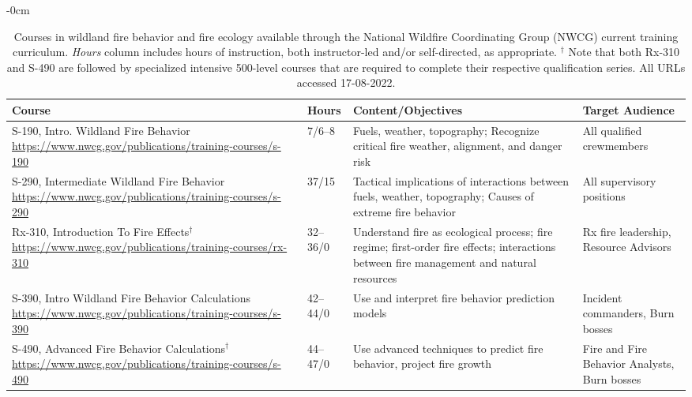 \documentclass[fire,casereport,accept,moreauthors,pdftex]{Definitions/mdpi}  %
\begin{document}
\begin{table}[H] 
\tablesize{\footnotesize}
\caption{Courses in wildland fire behavior and fire ecology available through the National Wildfire Coordinating Group (NWCG) current training curriculum.
\emph{Hours} column includes hours of instruction, both instructor-led and/or self-directed, as appropriate. 
$^\dagger$ Note that both Rx-310 and S-490 are followed by specialized intensive 500-level courses that are required to complete their respective qualification series. All URLs accessed 17-08-2022.}
\label{tab:training}
\begin{adjustwidth}{-\extralength}{0cm}
		\begin{tabularx}{\fulllength}{CCCC}
\toprule
\textbf{Course} & \textbf{Hours} & \textbf{Content/Objectives} & \textbf{Target Audience} \\ \midrule

{{S-190, Intro. Wildland Fire Behavior}} \url{https://www.nwcg.gov/publications/training-courses/s-190}  & 7/6--8 & Fuels, weather, topography; Recognize critical fire weather, alignment, and danger risk & All qualified crewmembers \\
{S-290, Intermediate Wildland Fire Behavior} \url{https://www.nwcg.gov/publications/training-courses/s-290}  & 37/15 & Tactical implications of interactions between fuels, weather, topography; Causes of extreme fire behavior & All supervisory positions \\
{Rx-310, Introduction To Fire Effects}$^\dagger$ \url{https://www.nwcg.gov/publications/training-courses/rx-310}  & 32--36/0 & Understand fire as ecological process; fire regime; first-order fire effects; interactions between fire management and natural resources & Rx fire leadership, Resource Advisors \\
{S-390, Intro Wildland Fire Behavior Calculations} \url{https://www.nwcg.gov/publications/training-courses/s-390}  & 42--44/0 & Use and interpret fire behavior prediction models & Incident commanders, Burn bosses \\
{S-490, Advanced Fire Behavior Calculations}$^\dagger$ \url{https://www.nwcg.gov/publications/training-courses/s-490}   & 44--47/0 & Use advanced techniques to predict fire behavior, project fire growth & Fire and Fire Behavior Analysts, Burn bosses \\
\bottomrule
\end{tabularx}
	\end{adjustwidth}
\end{table} %
\end{document}
